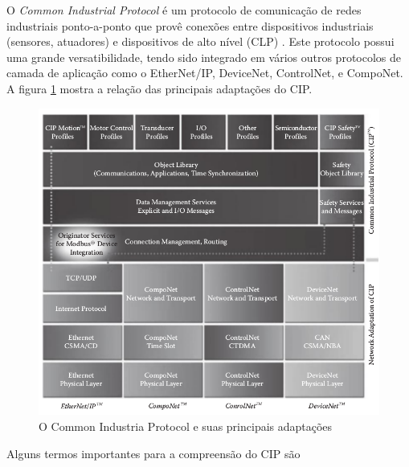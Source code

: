 O {\it Common Industrial Protocol} é um protocolo de comunicação de redes industriais ponto-a-ponto que provê conexões entre dispositivos industriais (sensores, atuadores) e dispositivos de alto nível (CLP) \cite{cip1}. Este protocolo possui uma grande versatibilidade, tendo sido integrado em vários outros protocolos de camada de aplicação como o EtherNet/IP\texttrademark, DeviceNet\texttrademark, ControlNet\texttrademark , e CompoNet\texttrademark. A figura \ref{im::cipadapt} mostra a relação das principais adaptações do CIP.

\begin{figure}[H]
\centering
\includegraphics[width=\textwidth]{imagens/cipadapt}
\caption{ O Common Industria Protocol e suas principais adaptações \cite{book:zur}}
\label{im::cipadapt}
\end{figure}

Alguns termos importantes para a compreensão do CIP são

